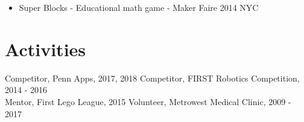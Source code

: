 \documentclass[10pt]{article}
\begin{document}
\begin{flushleft}
\begin{itemize}
		\item Super Blocks - Educational math game - Maker Faire 2014 NYC
	\end{itemize}

\section{Activities}
	Competitor, Penn Apps, 2017, 2018 \hfill Competitor, FIRST Robotics Competition, 2014 - 2016 \\
	Mentor, First Lego League, 2015 \hfill Volunteer, Metrowest Medical Clinic, 2009 - 2017


\end{flushleft}
\end{document}
